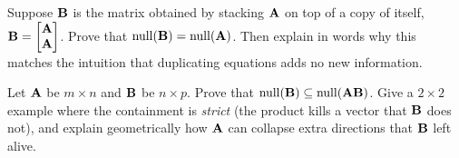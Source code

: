 \begin{exercise}\label{ch12:ex-proof-stack}
Suppose $\mathbf{B}$ is the matrix obtained by stacking $\mathbf{A}$ on top of a copy of
itself, $\mathbf{B}=\begin{bmatrix}\mathbf{A}\\\mathbf{A}\end{bmatrix}$. Prove that
$\operatorname{null}(\mathbf{B})=\operatorname{null}(\mathbf{A})$. Then explain in words why this matches the
intuition that duplicating equations adds no new information.
\end{exercise}

\begin{exercise}\label{ch12:ex-product}
Let $\mathbf{A}$ be $m\times n$ and $\mathbf{B}$ be $n\times p$. Prove that
$\operatorname{null}(\mathbf{B})\subseteq\operatorname{null}(\mathbf{A}\mathbf{B})$. Give a $2\times2$ example
where the containment is \emph{strict} (the product kills a vector that $\mathbf{B}$
does not), and explain geometrically how $\mathbf{A}$ can collapse extra directions
that $\mathbf{B}$ left alive.
\end{exercise}
